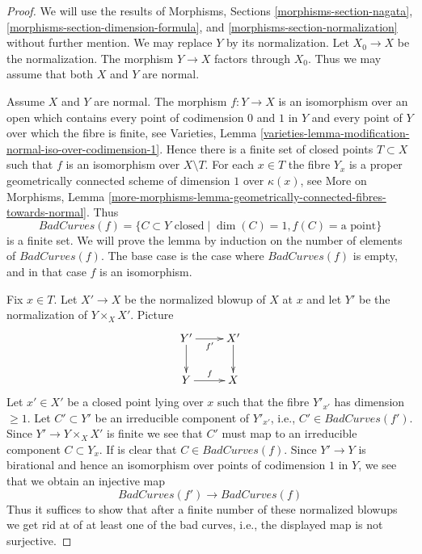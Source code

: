 \documentclass[10pt,a4paper]{amsart}
\theoremstyle{plain}
\theoremstyle{definition}
\theoremstyle{remark}
\numberwithin{equation}{subsection}
\begin{document}
\begin{proof}
We will use the results of Morphisms, Sections
\ref{morphisms-section-nagata},
\ref{morphisms-section-dimension-formula}, and
\ref{morphisms-section-normalization} without further mention.
We may replace $Y$ by its normalization. Let $X_0 \to X$
be the normalization. The morphism $Y \to X$ factors through $X_0$.
Thus we may assume that both $X$ and $Y$ are normal.

\medskip\noindent
Assume $X$ and $Y$ are normal. The morphism $f : Y \to X$ is an isomorphism
over an open which contains every point of codimension $0$ and $1$ in $Y$ and
every point of $Y$ over which the fibre is finite, see Varieties, Lemma
\ref{varieties-lemma-modification-normal-iso-over-codimension-1}.
Hence there is a finite set of closed points $T \subset X$
such that $f$ is an isomorphism over $X \setminus T$. For each $x \in T$
the fibre $Y_x$ is a proper geometrically connected scheme of dimension $1$
over $\kappa(x)$, see
More on Morphisms, Lemma
\ref{more-morphisms-lemma-geometrically-connected-fibres-towards-normal}.
Thus
$$
BadCurves(f) = \{C \subset Y\text{ closed} \mid
\dim(C) = 1, f(C) = \text{a point}\}
$$
is a finite set. We will prove the lemma by induction on the number
of elements of $BadCurves(f)$. The base case is the case where $BadCurves(f)$
is empty, and in that case $f$ is an isomorphism.

\medskip\noindent
Fix $x \in T$. Let $X' \to X$ be the normalized blowup of $X$ at $x$ and let
$Y'$ be the normalization of $Y \times_X X'$. Picture
$$
\xymatrix{
Y' \ar[r]_{f'} \ar[d] & X' \ar[d] \\
Y \ar[r]^f & X
}
$$
Let $x' \in X'$ be a closed point lying over $x$ such that
the fibre $Y'_{x'}$ has dimension $\geq 1$. Let $C' \subset Y'$
be an irreducible component of $Y'_{x'}$, i.e., $C' \in BadCurves(f')$.
Since $Y' \to Y \times_X X'$ is finite we see that $C'$ must map
to an irreducible component $C \subset Y_x$.
If is clear that $C \in BadCurves(f)$.
Since $Y' \to Y$ is birational and hence an isomorphism over points of
codimension $1$ in $Y$, we see that we obtain an injective map
$$
BadCurves(f') \longrightarrow BadCurves(f)
$$
Thus it suffices to show that after a finite number of these
normalized blowups we get rid at of at least one of the bad
curves, i.e., the displayed map is not surjective.


\end{proof}
\end{document}
